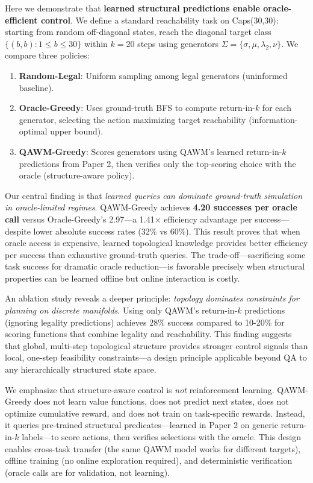 Here we demonstrate that \textbf{learned structural predictions enable oracle-efficient control}. We define a standard reachability task on Caps(30,30): starting from random off-diagonal states, reach the diagonal target class $\{(b,b) : 1 \le b \le 30\}$ within $k=20$ steps using generators $\Sigma = \{\sigma, \mu, \lambda_2, \nu\}$. We compare three policies:

\begin{enumerate}
\item \textbf{Random-Legal}: Uniform sampling among legal generators (uninformed baseline).
\item \textbf{Oracle-Greedy}: Uses ground-truth BFS to compute return-in-$k$ for each generator, selecting the action maximizing target reachability (information-optimal upper bound).
\item \textbf{QAWM-Greedy}: Scores generators using QAWM's learned return-in-$k$ predictions from Paper 2, then verifies only the top-scoring choice with the oracle (structure-aware policy).
\end{enumerate}

Our central finding is that \textit{learned queries can dominate ground-truth simulation in oracle-limited regimes}. QAWM-Greedy achieves \textbf{4.20 successes per oracle call} versus Oracle-Greedy's 2.97—a 1.41$\times$ efficiency advantage per success—despite lower absolute success rates (32\% vs 60\%). This result proves that when oracle access is expensive, learned topological knowledge provides better efficiency per success than exhaustive ground-truth queries. The trade-off—sacrificing some task success for dramatic oracle reduction—is favorable precisely when structural properties can be learned offline but online interaction is costly.

An ablation study reveals a deeper principle: \textit{topology dominates constraints for planning on discrete manifolds}. Using only QAWM's return-in-$k$ predictions (ignoring legality predictions) achieves 28\% success compared to 10-20\% for scoring functions that combine legality and reachability. This finding suggests that global, multi-step topological structure provides stronger control signals than local, one-step feasibility constraints—a design principle applicable beyond QA to any hierarchically structured state space.

We emphasize that structure-aware control is \textit{not} reinforcement learning. QAWM-Greedy does not learn value functions, does not predict next states, does not optimize cumulative reward, and does not train on task-specific rewards. Instead, it queries pre-trained structural predicates—learned in Paper 2 on generic return-in-$k$ labels—to score actions, then verifies selections with the oracle. This design enables cross-task transfer (the same QAWM model works for different targets), offline training (no online exploration required), and deterministic verification (oracle calls are for validation, not learning).

